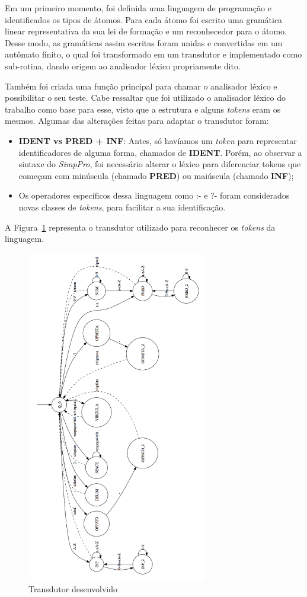 
Em um primeiro momento, foi definida uma linguagem de programação e identificados os tipos de átomos. Para cada átomo foi escrito uma gramática linear representativa da sua lei de formação e um reconhecedor para o átomo. Desse modo, as gramáticas assim escritas foram unidas e convertidas em um autômato finito, o qual foi transformado em um transdutor e implementado como sub-rotina, dando origem ao analisador léxico propriamente dito.

Também foi criada uma função principal para chamar o analisador léxico e possibilitar o seu teste. Cabe ressaltar que foi utilizado o analisador léxico do trabalho como base para esse, visto que a estrutura e alguns \emph{tokens} eram os mesmos. Algumas das alterações feitas para adaptar o transdutor foram:

\begin{itemize}
	\item \textbf{IDENT vs PRED + INF}: Antes, só havíamos um \emph{token} para representar identificadores de alguma forma, chamados de \textbf{IDENT}. Porém, ao observar a sintaxe do \emph{SimpPro}, foi necessário alterar o léxico para diferenciar tokens que começam com minúscula (chamado \textbf{PRED}) ou maiúscula (chamado \textbf{INF});
	\item Os operadores específicos dessa linguagem como :- e ?- foram considerados novas classes de \emph{tokens}, para facilitar a sua identificação.
\end{itemize} 

A Figura~\ref{fig:transdutor} representa o transdutor utilizado para reconhecer os \emph{tokens} da linguagem.

\begin{figure}[htbp]
    \centering
    \includegraphics[width=0.7\textwidth]{./images/transdutor.png}
    \caption{Transdutor desenvolvido}
    \label{fig:transdutor}
\end{figure}
